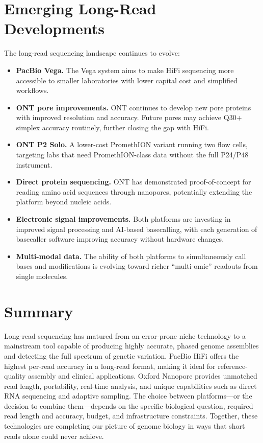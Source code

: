 \section{Emerging Long-Read Developments}
\label{sec:longread_emerging}

The long-read sequencing landscape continues to evolve:

\begin{itemize}
  \item \textbf{PacBio Vega.} The Vega system aims to make HiFi sequencing more accessible to smaller laboratories with lower capital cost and simplified workflows.

  \item \textbf{ONT pore improvements.} ONT continues to develop new pore proteins with improved resolution and accuracy. Future pores may achieve Q30+ simplex accuracy routinely, further closing the gap with HiFi.

  \item \textbf{ONT P2 Solo.} A lower-cost PromethION variant running two flow cells, targeting labs that need PromethION-class data without the full P24/P48 instrument.

  \item \textbf{Direct protein sequencing.} ONT has demonstrated proof-of-concept for reading amino acid sequences through nanopores, potentially extending the platform beyond nucleic acids.

  \item \textbf{Electronic signal improvements.} Both platforms are investing in improved signal processing and AI-based basecalling, with each generation of basecaller software improving accuracy without hardware changes.

  \item \textbf{Multi-modal data.} The ability of both platforms to simultaneously call bases and modifications is evolving toward richer ``multi-omic'' readouts from single molecules.
\end{itemize}


\section{Summary}

Long-read sequencing has matured from an error-prone niche technology to a mainstream tool capable of producing highly accurate, phased genome assemblies and detecting the full spectrum of genetic variation. PacBio HiFi offers the highest per-read accuracy in a long-read format, making it ideal for reference-quality assembly and clinical applications. Oxford Nanopore provides unmatched read length, portability, real-time analysis, and unique capabilities such as direct RNA sequencing and adaptive sampling. The choice between platforms---or the decision to combine them---depends on the specific biological question, required read length and accuracy, budget, and infrastructure constraints. Together, these technologies are completing our picture of genome biology in ways that short reads alone could never achieve.
